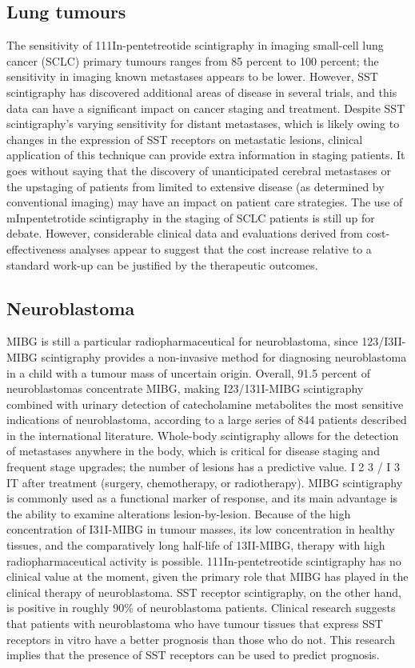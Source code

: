 \documentclass{article}
\begin{document}
\begin{multicols}{2}
\subsection{Lung tumours}
The sensitivity of 111In-pentetreotide scintigraphy in imaging small-cell lung cancer (SCLC) primary tumours ranges from 85 percent to 100 percent; the sensitivity in imaging known metastases appears to be lower. However, SST scintigraphy has discovered additional areas of disease in several trials, and this data can have a significant impact on cancer staging and treatment. Despite SST scintigraphy's varying sensitivity for distant metastases, which is likely owing to changes in the expression of SST receptors on metastatic lesions, clinical application of this technique can provide extra information in staging patients. It goes without saying that the discovery of unanticipated cerebral metastases or the upstaging of patients from limited to extensive disease (as determined by conventional imaging) may have an impact on patient care strategies. The use of mInpentetrotide scintigraphy in the staging of SCLC patients is still up for debate. However, considerable clinical data and evaluations derived from cost-effectiveness analyses appear to suggest that the cost increase relative to a standard work-up can be justified by the therapeutic outcomes.

\subsection{Neuroblastoma}
MIBG is still a particular radiopharmaceutical for neuroblastoma, since 123/I3II-MIBG scintigraphy provides a non-invasive method for diagnosing neuroblastoma in a child with a tumour mass of uncertain origin. Overall, 91.5 percent of neuroblastomas concentrate MIBG, making I23/131I-MIBG scintigraphy combined with urinary detection of catecholamine metabolites the most sensitive indications of neuroblastoma, according to a large series of 844 patients described in the international literature. Whole-body scintigraphy allows for the detection of metastases anywhere in the body, which is critical for disease staging and frequent stage upgrades; the number of lesions has a predictive value. I 2 3 / I 3 IT after treatment (surgery, chemotherapy, or radiotherapy). MIBG scintigraphy is commonly used as a functional marker of response, and its main advantage is the ability to examine alterations lesion-by-lesion. Because of the high concentration of I31I-MIBG in tumour masses, its low concentration in healthy tissues, and the comparatively long half-life of 13II-MIBG, therapy with high radiopharmaceutical activity is possible. 111In-pentetreotide scintigraphy has no clinical value at the moment, given the primary role that MIBG has played in the clinical therapy of neuroblastoma. SST receptor scintigraphy, on the other hand, is positive in roughly 90\% of neuroblastoma patients. Clinical research suggests that patients with neuroblastoma who have tumour tissues that express SST receptors in vitro have a better prognosis than those who do not. This research implies that the presence of SST receptors can be used to predict prognosis.


\end{multicols}
\end{document}
